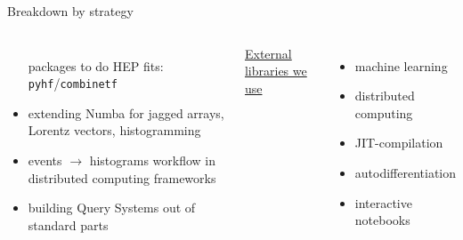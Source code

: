 \documentclass[aspectratio=169]{beamer}
\begin{document}
\begin{frame}{Breakdown by strategy}
\begin{columns}[t]
\begin{itemize}
packages to do HEP fits: \texttt{pyhf}/\texttt{combinetf}
\item extending Numba for jagged arrays, Lorentz vectors, histogramming
\item events $\to$ histograms workflow in distributed computing frameworks
\item building Query Systems out of standard parts
\end{itemize}

\underline{\large External libraries we use}

\vspace{0.15 cm}
\begin{itemize}
\item machine learning
\item distributed computing
\item JIT-compilation
\item autodifferentiation
\item interactive notebooks
\end{itemize}

\end{columns}
\end{frame}
\end{document}
